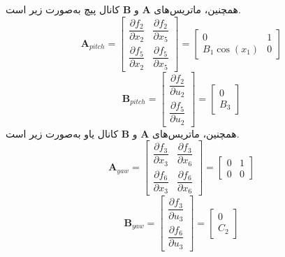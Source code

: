 همچنین، ماتریس‌های $\boldsymbol{A}$ و $\boldsymbol{B}$ کانال پیچ به‌صورت زیر است.
\begin{equation}
	\boldsymbol A_{pitch} = \begin{bmatrix}
		\dfrac{\partial  f_2}{\partial  x_2}& \dfrac{\partial  f_2}{\partial  x_5}
		\\[1em]
		\dfrac{\partial  f_5}{\partial  x_2}& \dfrac{\partial  f_5}{\partial  x_5}
	\end{bmatrix} = 
	\begin{bmatrix}
		0 & 1\\
		B_1\cos(x_1) & 0
	\end{bmatrix}
\end{equation}
\begin{equation}
	\boldsymbol B_{pitch} = \begin{bmatrix}
		\dfrac{\partial  f_2}{\partial  u_2}
		\\[1em]
		\dfrac{\partial  f_5}{\partial  u_2}
	\end{bmatrix} = 
	\begin{bmatrix}
		0\\
		B_3
	\end{bmatrix}
\end{equation}
همچنین، ماتریس‌های $\boldsymbol{A}$ و $\boldsymbol{B}$ کانال یاو به‌صورت زیر است.
\begin{equation}
	\boldsymbol A_{yaw} = \begin{bmatrix}
		\dfrac{\partial  f_3}{\partial  x_3}& \dfrac{\partial  f_3}{\partial  x_6}
		\\[1em]
		\dfrac{\partial  f_6}{\partial  x_3}& \dfrac{\partial  f_6}{\partial  x_6}
	\end{bmatrix} = 
	\begin{bmatrix}
		0 & 1\\
		0 & 0
	\end{bmatrix}
\end{equation}
\begin{equation}
	\boldsymbol B_{yaw} = \begin{bmatrix}
		\dfrac{\partial  f_3}{\partial  u_3}
		\\[1em]
		\dfrac{\partial  f_6}{\partial  u_3}
	\end{bmatrix} = 
	\begin{bmatrix}
		0\\
		C_2
	\end{bmatrix}
\end{equation}
